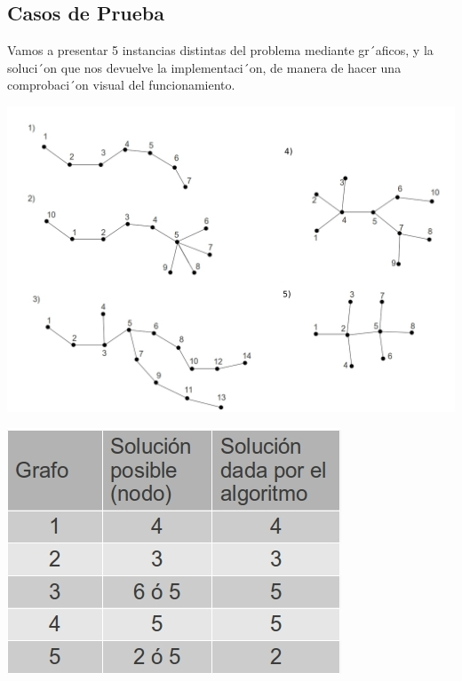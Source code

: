 \subsection{Casos de Prueba}

Vamos a presentar 5 instancias distintas del problema mediante gr´aficos, y la soluci´on que nos devuelve la implementaci´on, de manera de hacer una comprobaci´on visual del funcionamiento.

\begin{center}
\includegraphics[scale=0.5]{ej2/2/graficos/imagen05.jpg} 
\end{center}

\begin{center}
\includegraphics[scale=0.5]{ej2/2/graficos/imagen06.jpg} 
\end{center}